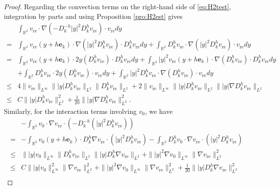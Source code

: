 \documentclass[12pt]{amsart}
\numberwithin{equation}{section}              %
\theoremstyle{remark}
\begin{document}
\begin{proof}
			Regarding the convection terms on the right-hand side of \eqref{eq:H2test}, integration by parts and using Proposition \ref{pro:H2est} gives
			\begin{equation*} 
				\begin{aligned} & \int_{\mathbb{R}^2} v_{\text{re}} \cdot \nabla (-D_k^{-h} |y|^2 D_k^h v_{\text{re}}) \cdot v_{\text{re}} dy \\
					= & \int_{\mathbb{R}^2} v_{\text{re}}(y+h\mathbf{e}_k) \cdot \nabla (|y|^2 D_k^h v_{\text{re}} ) \cdot D_k^h v_{\text{re}} dy + \int_{\mathbb{R}^2} D_k^h v_{\text{re}} \cdot \nabla (|y|^2 D_k^h v_{\text{re}}) \cdot v_{\text{re}}  dy \\ = & \int_{\mathbb{R}^2} v_{\text{re}}(y+h\mathbf{e}_k) \cdot 2y   ( D_k^h v_{\text{re}}) \cdot D_k^h v_{\text{re}}  dy + \int_{\mathbb{R}^2} |y|^2 v_{\text{re}} (y+h\mathbf{e}_k) \cdot \nabla ( D_k^h v_{\text{re}}) \cdot  D_k^h v_{\text{re}} dy  \\
					& + \int_{\mathbb{R}^2}  D_k^h v_{\text{re}} \cdot 2y   ( D_k^h v_{\text{re}}) \cdot  v_{\text{re}} dy
					+ \int_{\mathbb{R}^2} |y|^2 D_k^h v_{\text{re}} \cdot \nabla ( D_k^h v_{\text{re}}) \cdot v_{\text{re}} dy\\
					\leq& 4\|v_{\text{re}}\|_{L^{\infty}}\||y|D_k^h v_{\text{re}}\|_{L^2} \|D_k^h v_{\text{re}}\|_{L^2}  + 2\|v_{\text{re}}\|_{L^{\infty}}\||y|D_k^h v_{\text{re}}\|_{L^2} \||y| \nabla D_k^h v_{\text{re}}\|_{L^2} \\			
					\leq& C\||y|D_k^h v_{\text{re}}\|_{L^2}^2  +  \frac{1}{20} \||y| \nabla D_k^h v_{\text{re}}\|_{L^2} ^2.
				\end{aligned}
			\end{equation*}
			Similarly, for the interaction terms involving $v_0$, we have
			\begin{equation*}
				\begin{aligned}
					&-\int_{\mathbb{R}^2} v_0 \cdot \nabla v_{\text{re}}  \cdot (-D_k^{-h} (|y|^2 D_k^h v_{\text{re}})) \\
					=& -\int_{\mathbb{R}^2} v_0(y+h\mathbf{e}_k) \cdot D_k^h \nabla v_{\text{re}}  \cdot (|y|^2 D_k^h v_{\text{re}}) -\int_{\mathbb{R}^2}D_k^{h} v_0 \cdot \nabla v_{\text{re}}  \cdot ( |y|^2 D_k^h v_{\text{re}}) \\
					\leq & \||y|v_0\|_{L^{\infty}}\|D_k^h v_{\text{re}}\|_{L^2} \||y| D_k^h \nabla v_{\text{re}}\|_{L^2}  +\||y|^2 \nabla v_0\|_{L^{\infty}} \|\nabla v_{\text{re}}\|_{L^2}^2  \\
					\leq & C \||y|v_0\|_{L^{\infty}}^2 \|\nabla v_{\text{re}}\|_{L^2}^2  + \||y|^2 \nabla v_0\|_{L^{\infty}} \|\nabla v_{\text{re}}\|_{L^2}^2 + \frac{1}{20}\||y| D_k^h \nabla v_{\text{re}}\|_{L^2}^2\\

\end{aligned}
\end{equation*}
\end{proof}
\end{document}

